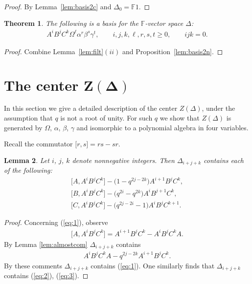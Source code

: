 \documentclass[pdftex]{sigma}
\numberwithin{equation}{section}
\newtheorem{Theorem}{Theorem}[section]
\newtheorem{Lemma}[Theorem]{Lemma}
\begin{document}
\begin{proof}
By Lemma~\ref{lem:basis2c} and
$\Delta_0=\mathbb F 1$.
\end{proof}




\begin{Theorem}
\label{lem:basis2}
The following is a basis for the $\mathbb F$-vector space
$\Delta$:
\begin{gather*}
A^iB^jC^k\Omega^\ell \alpha^r \beta^s \gamma^t, \qquad
i,j,k,\ell, r,s,t\geq 0,
 \qquad ijk=0.
\end{gather*}
\end{Theorem}

\begin{proof}
Combine
Lemma~\ref{lem:filt}$(ii)$
and
Proposition~\ref{lem:basis2n}.
\end{proof}







\section[The center $Z(\Delta)$]{The center $\boldsymbol{Z(\Delta)}$}

In this section we give a detailed description of
the center $Z(\Delta)$, under the assumption that $q$ is not a root of
 unity.
For such $q$ we show that $Z(\Delta)$ is generated by
$\Omega$, $\alpha$, $\beta$, $\gamma$ and
 isomorphic to a polynomial algebra in four
variables.

  Recall the commutator
 $\lbrack r,s\rbrack=rs-sr$.


\begin{Lemma}
\label{lem:ijk}
Let
$i$, $j$, $k$
denote nonnegative integers.
Then $\Delta_{i+j+k}$ contains each of the fol\-lo\-wing:
\begin{gather}
\label{eq:1}
 \big\lbrack A,A^iB^jC^k\big\rbrack - \big(1-q^{2j-2k}\big)A^{i+1}B^jC^k,
\\
\label{eq:2}
 \big\lbrack B,A^iB^jC^k\big\rbrack - \big(q^{2i}-q^{2k}\big)A^iB^{j+1}C^k,
\\
\label{eq:3}
 \big\lbrack C,A^iB^jC^k\big\rbrack - \big(q^{2j-2i}-1\big)A^iB^jC^{k+1}.
\end{gather}
\end{Lemma}

\begin{proof}
Concerning (\ref{eq:1}), observe
\begin{gather*}
\big\lbrack A,A^iB^jC^k\big\rbrack = A^{i+1}B^jC^k -A^iB^jC^kA.
\end{gather*}
By Lemma
\ref{lem:almostcom} $\Delta_{i+j+k}$ contains
\begin{gather*}
A^iB^jC^kA - q^{2j-2k}A^{i+1}B^jC^k.
\end{gather*}
By these comments
$\Delta_{i+j+k}$ contains
(\ref{eq:1}).
One similarly f\/inds that
$\Delta_{i+j+k}$ contains
(\ref{eq:2}),
(\ref{eq:3}).
\end{proof}
\end{document}

